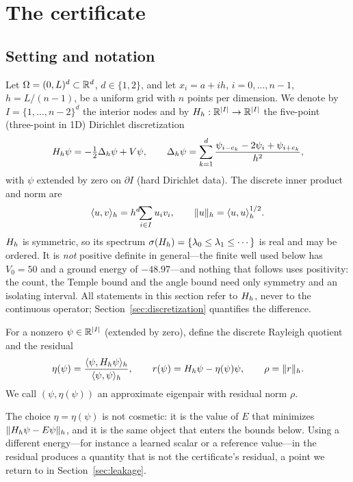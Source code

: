 \section{The certificate}
\label{sec:cert}

\subsection{Setting and notation}

Let $\Omega=(0,L)^d\subset\mathbb{R}^d$, $d\in\{1,2\}$, and let $x_i=a+ih$,
$i=0,\dots,n-1$, $h=L/(n-1)$, be a uniform grid with $n$ points per dimension.
We denote by $I=\{1,\dots,n-2\}^d$ the interior nodes and by
$H_h:\mathbb{R}^{|I|}\to\mathbb{R}^{|I|}$ the five-point (three-point in 1D) Dirichlet
discretization
\begin{equation}
  H_h \psi = -\tfrac12\Delta_h\psi + V\psi,\qquad
  \Delta_h\psi = \sum_{k=1}^{d}\frac{\psi_{i-e_k}-2\psi_i+\psi_{i+e_k}}{h^2},
  \label{eq:Hh}
\end{equation}
with $\psi$ extended by zero on $\partial I$ (hard Dirichlet data).
The discrete inner product and norm are
\begin{equation}
  \langle u,v\rangle_h = h^d\!\!\sum_{i\in I} u_i v_i,
  \qquad \lVert u\rVert_h=\langle u,u\rangle_h^{1/2}.
\end{equation}
$H_h$ is symmetric, so its spectrum
$\sigma(H_h)=\{\lambda_0\le\lambda_1\le\cdots\}$ is real and may be ordered. It
is \emph{not} positive definite in general---the finite well used below has
$V_0=50$ and a ground energy of $-48.97$---and nothing that follows uses
positivity: the count, the Temple bound and the angle bound need only symmetry
and an isolating interval. All statements in this section refer to $H_h$, never to the
continuous operator; Section~\ref{sec:discretization} quantifies the
difference.

\begin{definition}\label{def:pair}
For a nonzero $\psi\in\mathbb{R}^{|I|}$ (extended by zero), define the discrete
Rayleigh quotient and the residual
\begin{equation}
  \eta(\psi) = \frac{\langle\psi,H_h\psi\rangle_h}{\langle\psi,\psi\rangle_h},
  \qquad
  r(\psi) = H_h\psi - \eta(\psi)\psi,
  \qquad
  \rho = \lVert r\rVert_h .
  \label{eq:residual}
\end{equation}
We call $(\psi,\eta(\psi))$ an approximate eigenpair with residual norm $\rho$.
\end{definition}

The choice $\eta=\eta(\psi)$ is not cosmetic: it is the value of $E$ that
minimizes $\lVert H_h\psi-E\psi\rVert_h$, and it is the same object that enters the
bounds below. Using a different energy---for instance a learned scalar or a
reference value---in the residual produces a quantity that is not the
certificate's residual, a point we return to in Section~\ref{sec:leakage}.

